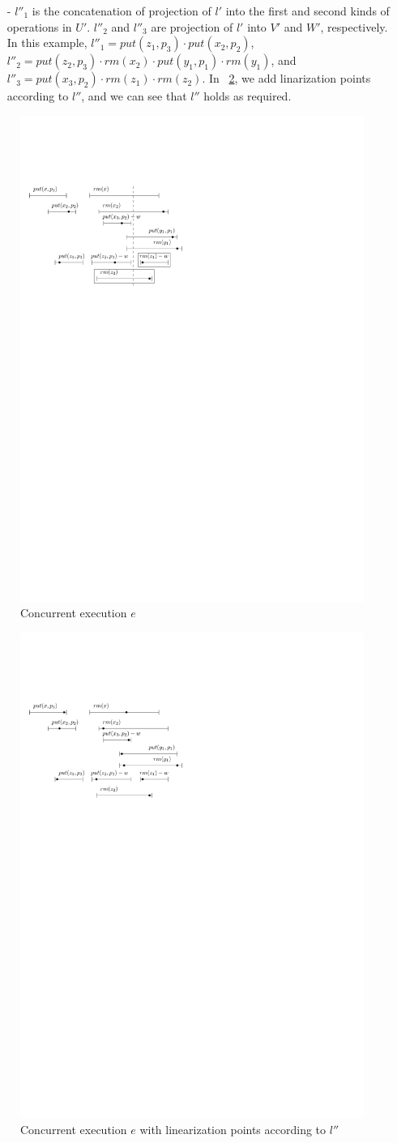 \begin{itemize}
\item[-] $l''_1$ is the concatenation of projection of $l'$ into the first and second kinds of operations in $U'$. $l''_2$ and $l''_3$ are projection of $l'$ into $V'$ and $W'$, respectively. In this example, $l''_1 = \textit{put}(z_1,p_3) \cdot \textit{put}(x_2,p_2)$, $l''_2 = \textit{put}(z_2,p_3) \cdot \textit{rm}(x_2) \cdot \textit{put}(y_1,p_1) \cdot \textit{rm}(y_1)$, and $l''_3 = \textit{put}(x_3,p_2) \cdot \textit{rm}(z_1) \cdot \textit{rm}(z_2)$. In \figurename~\ref{fig:concurrent execution with new linearization points for EPQ1}, we add linarization points according to $l''$, and we can see that $l''$ holds as required.
\end{itemize}

\begin{figure}[htbp]
  \centering
  \includegraphics[width=0.5 \textwidth]{figures/PIC-HIS-EPQ1.pdf}
  \caption{Concurrent execution $e$}
  \label{fig:concurrent execution for EPQ1}
\end{figure}


\begin{figure}[htbp]
  \centering
  \includegraphics[width=0.5 \textwidth]{figures/PIC-HIS-EPQ1-NEWLP.pdf}
  \caption{Concurrent execution $e$ with linearization points according to $l''$}
  \label{fig:concurrent execution with new linearization points for EPQ1}
\end{figure}



